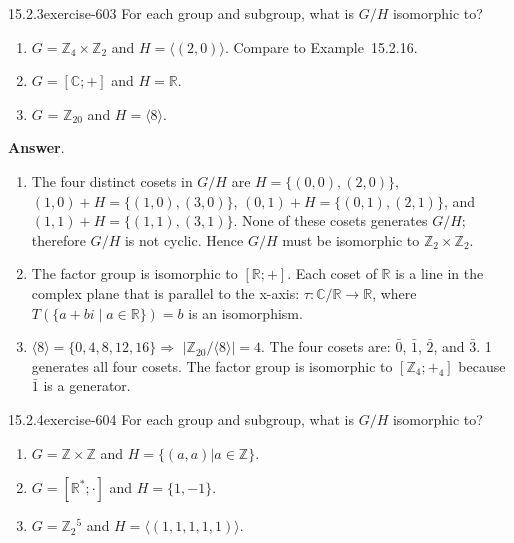 \documentclass[twoside,10pt,]{book}
\numberwithin{equation}{section}
\begin{document}
\begin{divisionsolution}{15.2.3}{}{exercise-603}%
\hypertarget{p-5412}{}%
For each group and subgroup, what is \(G/H\) isomorphic to?\leavevmode%
\begin{enumerate}[label=(\alph*)]
\item\hypertarget{li-2413}{}\hypertarget{p-5413}{}%
\(G = \mathbb{Z}_4 \times \mathbb{Z}_2\)  and  \(H = \langle (2, 0)\rangle\). Compare to Example~15.2.16.%
\item\hypertarget{li-2414}{}\hypertarget{p-5414}{}%
\(G = [\mathbb{C}; +]\)  and \(H = \mathbb{R}\).%
\item\hypertarget{li-2415}{}\hypertarget{p-5415}{}%
\(G\) = \(\mathbb{Z}_{20}\)  and  \(H = \langle 8\rangle\).%
\end{enumerate}
%
\par\smallskip%
\noindent\textbf{Answer}.\quad%
\hypertarget{p-5416}{}%
\leavevmode%
\begin{enumerate}[label=(\alph*)]
\item\hypertarget{li-2416}{}\hypertarget{p-5417}{}%
The four distinct cosets in \(G/H\) are \(H = \{(0, 0), (2, 0)\}\), \((1, 0) + H= \{(1,0),(3,0)\}\), \((0, 1) + H= \{(0,1),(2,1)\}\),  and \((1, 1) + H= \{(1,1),(3,1)\}\). None of these cosets generates \(G/H\); therefore \(G/H\) is not cyclic. Hence \(G/H\) must be isomorphic to \(\mathbb{Z}_2\times \mathbb{Z}_2\).%
\item\hypertarget{li-2417}{}\hypertarget{p-5418}{}%
The factor group is isomorphic to \([\mathbb{R}; +]\). Each coset of \(\mathbb{R}\) is a line in the complex plane that is parallel to the x-axis: \(\tau :\mathbb{C}/\mathbb{R}\to  \mathbb{R}\), where \(T(\{a + b i\mid a\in \mathbb{R}\}) = b\) is an isomorphism.%
\item\hypertarget{li-2418}{}\hypertarget{p-5419}{}%
\(\langle 8\rangle  = \{0, 4, 8, 12, 16\} \)\(\Rightarrow\)  \(\lvert \mathbb{Z}_{20}/\langle 8\rangle \rvert =4\). The four cosets are: \(\bar{0}\), \(\bar{1}\), \(\bar{2}\), and \(\bar{3}\). 1 generates all four cosets.  The factor group is isomorphic to \([\mathbb{Z}_4; +_4]\)  because \(\bar{1}\) is a generator.%
\end{enumerate}
%
\end{divisionsolution}%
\begin{divisionsolution}{15.2.4}{}{exercise-604}%
\hypertarget{p-5420}{}%
For each group and subgroup, what is \(G/H\) isomorphic to?\leavevmode%
\begin{enumerate}[label=(\alph*)]
\item\hypertarget{li-2419}{}\hypertarget{p-5421}{}%
\(G = \mathbb{Z}\times \mathbb{Z}\) and  \(H = \{(a, a) | a \in  \mathbb{Z}\}\).%
\item\hypertarget{li-2420}{}\hypertarget{p-5422}{}%
\(G = \left[\mathbb{R}^*; \cdot \right]\)  and  \(H = \{1, -1\}\).%
\item\hypertarget{li-2421}{}\hypertarget{p-5423}{}%
\(G =\mathbb{Z}_2{}^5\)  and \(H = \langle (1, 1, 1, 1, 1)\rangle\).%
\end{enumerate}
%
\end{divisionsolution}%
\end{document}
